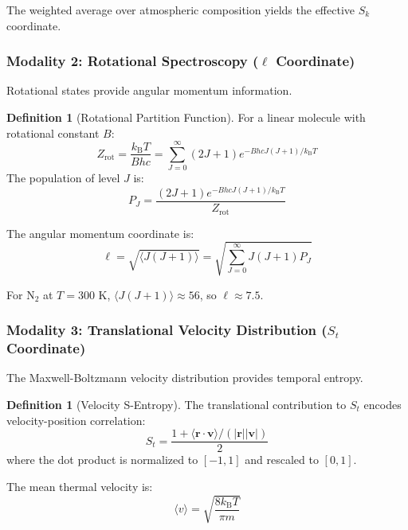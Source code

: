 \documentclass[twocolumn,10pt,a4paper]{article}
\theoremstyle{definition}
\newtheorem{definition}[theorem]{Definition}
\theoremstyle{remark}
\newcommand{\kB}{k_{\mathrm{B}}}
\begin{document}
The weighted average over atmospheric composition yields the effective $S_k$ coordinate.

\subsubsection{Modality 2: Rotational Spectroscopy ($\ell$ Coordinate)}

Rotational states provide angular momentum information.

\begin{definition}[Rotational Partition Function]
\label{def:rot_partition}
For a linear molecule with rotational constant $B$:
\begin{equation}
    Z_{\text{rot}} = \frac{\kB T}{B h c} = \sum_{J=0}^{\infty} (2J+1) e^{-B h c J(J+1)/\kB T}
\end{equation}
The population of level $J$ is:
\begin{equation}
    P_J = \frac{(2J+1) e^{-B h c J(J+1)/\kB T}}{Z_{\text{rot}}}
\end{equation}
\end{definition}

The angular momentum coordinate is:
\begin{equation}
    \ell = \sqrt{\langle J(J+1) \rangle} = \sqrt{\sum_{J=0}^{\infty} J(J+1) P_J}
\end{equation}

For N$_2$ at $T = 300$ K, $\langle J(J+1) \rangle \approx 56$, so $\ell \approx 7.5$.

\subsubsection{Modality 3: Translational Velocity Distribution ($S_t$ Coordinate)}

The Maxwell-Boltzmann velocity distribution provides temporal entropy.

\begin{definition}[Velocity S-Entropy]
\label{def:vel_entropy}
The translational contribution to $S_t$ encodes velocity-position correlation:
\begin{equation}
    S_t = \frac{1 + \langle \mathbf{r} \cdot \mathbf{v} \rangle / (|\mathbf{r}||\mathbf{v}|)}{2}
\end{equation}
where the dot product is normalized to $[-1, 1]$ and rescaled to $[0, 1]$.
\end{definition}

The mean thermal velocity is:
\begin{equation}
    \langle v \rangle = \sqrt{\frac{8\kB T}{\pi m}}
\end{equation}
\end{document}
